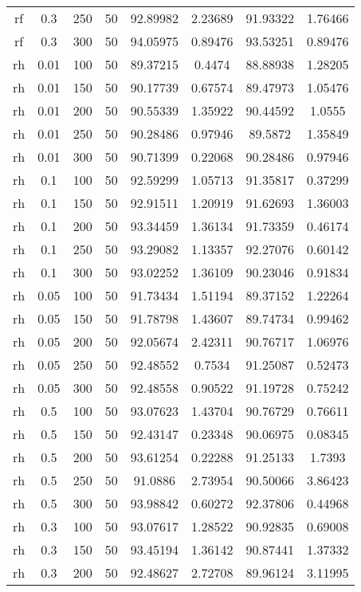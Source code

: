 \begin{table}[htbp]
\begin{tabular}{|c|c|c|c|c|c|c|c|}
rf & 0.3 & 250 & 50 & 92.89982 & 2.23689 & 91.93322 & 1.76466 \\
rf & 0.3 & 300 & 50 & 94.05975 & 0.89476 & 93.53251 & 0.89476 \\
rh & 0.01 & 100 & 50 & 89.37215 & 0.4474 & 88.88938 & 1.28205 \\
rh & 0.01 & 150 & 50 & 90.17739 & 0.67574 & 89.47973 & 1.05476 \\
rh & 0.01 & 200 & 50 & 90.55339 & 1.35922 & 90.44592 & 1.0555 \\
rh & 0.01 & 250 & 50 & 90.28486 & 0.97946 & 89.5872 & 1.35849 \\
rh & 0.01 & 300 & 50 & 90.71399 & 0.22068 & 90.28486 & 0.97946 \\
rh & 0.1 & 100 & 50 & 92.59299 & 1.05713 & 91.35817 & 0.37299 \\
rh & 0.1 & 150 & 50 & 92.91511 & 1.20919 & 91.62693 & 1.36003 \\
rh & 0.1 & 200 & 50 & 93.34459 & 1.36134 & 91.73359 & 0.46174 \\
rh & 0.1 & 250 & 50 & 93.29082 & 1.13357 & 92.27076 & 0.60142 \\
rh & 0.1 & 300 & 50 & 93.02252 & 1.36109 & 90.23046 & 0.91834 \\
rh & 0.05 & 100 & 50 & 91.73434 & 1.51194 & 89.37152 & 1.22264 \\
rh & 0.05 & 150 & 50 & 91.78798 & 1.43607 & 89.74734 & 0.99462 \\
rh & 0.05 & 200 & 50 & 92.05674 & 2.42311 & 90.76717 & 1.06976 \\
rh & 0.05 & 250 & 50 & 92.48552 & 0.7534 & 91.25087 & 0.52473 \\
rh & 0.05 & 300 & 50 & 92.48558 & 0.90522 & 91.19728 & 0.75242 \\
rh & 0.5 & 100 & 50 & 93.07623 & 1.43704 & 90.76729 & 0.76611 \\
rh & 0.5 & 150 & 50 & 92.43147 & 0.23348 & 90.06975 & 0.08345 \\
rh & 0.5 & 200 & 50 & 93.61254 & 0.22288 & 91.25133 & 1.7393 \\
rh & 0.5 & 250 & 50 & 91.0886 & 2.73954 & 90.50066 & 3.86423 \\
rh & 0.5 & 300 & 50 & 93.98842 & 0.60272 & 92.37806 & 0.44968 \\
rh & 0.3 & 100 & 50 & 93.07617 & 1.28522 & 90.92835 & 0.69008 \\
rh & 0.3 & 150 & 50 & 93.45194 & 1.36142 & 90.87441 & 1.37332 \\
rh & 0.3 & 200 & 50 & 92.48627 & 2.72708 & 89.96124 & 3.11995 \\

\end{tabular}
\end{table}
